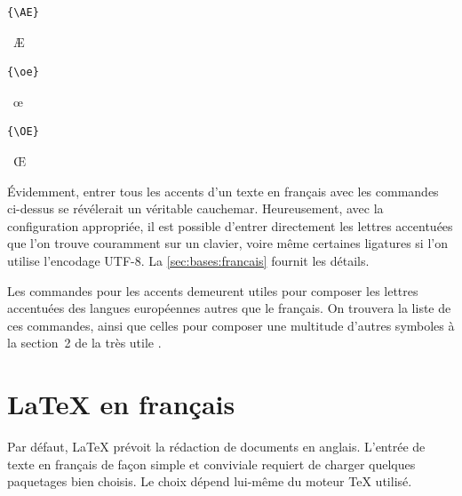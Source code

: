 \begin{demo}
  \hfill
  \begin{minipage}{0.2\linewidth}
    \begin{texample}
\begin{lstlisting}
{\AE}
\end{lstlisting}
      \producing\ \AE
    \end{texample}
  \end{minipage}
  \hfill
  \begin{minipage}{0.2\linewidth}
    \begin{texample}
\begin{lstlisting}
{\oe}
\end{lstlisting}
      \producing\ \oe
    \end{texample}
  \end{minipage}
  \hfill
  \begin{minipage}{0.2\linewidth}
    \begin{texample}
\begin{lstlisting}
{\OE}
\end{lstlisting}
      \producing\ \OE
    \end{texample}
  \end{minipage}
\end{demo}

Évidemment, entrer tous les accents d'un texte en français avec les
commandes ci-dessus se révélerait un véritable cauchemar.
Heureusement, avec la configuration appropriée, il est possible
d'entrer directement les lettres accentuées que l'on trouve couramment
sur un clavier, voire même certaines ligatures si l'on utilise
l'encodage UTF-8. La \autoref{sec:bases:francais} fournit les détails.

Les commandes pour les accents demeurent utiles pour composer les
lettres accentuées des langues européennes autres que le français. On
trouvera la liste de ces commandes, ainsi que celles pour composer une
multitude d'autres symboles à la section~2 de la très utile %
\citep{comprehensive}.


\section{{\LaTeX} en français}
\label{sec:bases:francais}

Par défaut, LaTeX prévoit la rédaction de documents en anglais.
L'entrée de texte en français de façon simple et conviviale requiert
de charger quelques paquetages bien choisis. Le choix dépend lui-même
du moteur {\TeX} utilisé.

